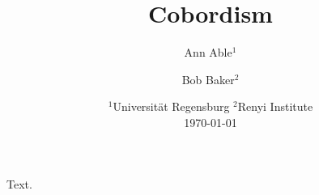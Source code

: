 \documentclass{article}
\title{Cobordism}
\author{Ann Able$^1$ \and Bob Baker$^2$}
\date{$^1$Universit\"at Regensburg \qquad $^2$Renyi Institute\\\bigskip\today
\footnotemark[0]
\footnotetext[0]{2020 \textit{Mathematics Subject Classification}: 57K10; 57R65, 57R90}}
\begin{document}
\maketitle
Text.
\end{document}
